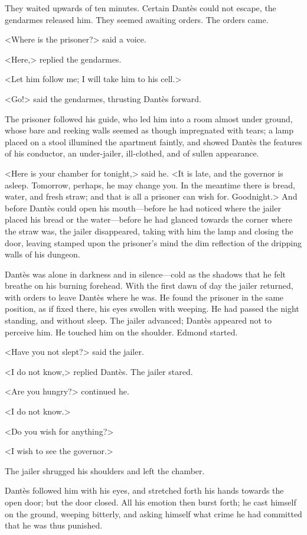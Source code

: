  They waited upwards of ten minutes. Certain Dantès could not escape, the gendarmes released him. They seemed awaiting orders. The orders came. 

 <Where is the prisoner?> said a voice. 

 <Here,> replied the gendarmes. 

 <Let him follow me; I will take him to his cell.> 

 <Go!> said the gendarmes, thrusting Dantès forward. 

 The prisoner followed his guide, who led him into a room almost under ground, whose bare and reeking walls seemed as though impregnated with tears; a lamp placed on a stool illumined the apartment faintly, and showed Dantès the features of his conductor, an under-jailer, ill-clothed, and of sullen appearance.  
 
 <Here is your chamber for tonight,> said he. <It is late, and the governor is asleep. Tomorrow, perhaps, he may change you. In the meantime there is bread, water, and fresh straw; and that is all a prisoner can wish for. Goodnight.> And before Dantès could open his mouth—before he had noticed where the jailer placed his bread or the water—before he had glanced towards the corner where the straw was, the jailer disappeared, taking with him the lamp and closing the door, leaving stamped upon the prisoner's mind the dim reflection of the dripping walls of his dungeon. 

 Dantès was alone in darkness and in silence—cold as the shadows that he felt breathe on his burning forehead. With the first dawn of day the jailer returned, with orders to leave Dantès where he was. He found the prisoner in the same position, as if fixed there, his eyes swollen with weeping. He had passed the night standing, and without sleep. The jailer advanced; Dantès appeared not to perceive him. He touched him on the shoulder. Edmond started. 

 <Have you not slept?> said the jailer. 

 <I do not know,> replied Dantès. The jailer stared. 

 <Are you hungry?> continued he. 

 <I do not know.> 

 <Do you wish for anything?> 

 <I wish to see the governor.> 

 The jailer shrugged his shoulders and left the chamber. 

 Dantès followed him with his eyes, and stretched forth his hands towards the open door; but the door closed. All his emotion then burst forth; he cast himself on the ground, weeping bitterly, and asking himself what crime he had committed that he was thus punished. 

